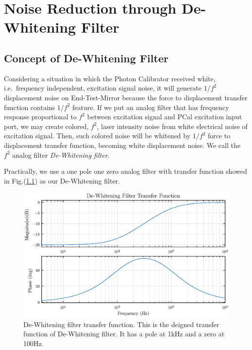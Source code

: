 

\chapter{Noise Reduction through De-Whitening Filter}

\section{Concept of De-Whitening Filter}
Considering a situation in which the Photon Calibrator received white, i.e.\ frequency independent, excitation signal noise, it will generate $1/f^2$ displacement noise on End-Test-Mirror because the force to displacement transfer function contains $1/f^2$ feature. If we put an analog filter that has frequency response proportional to $f^2$ between excitation signal and PCal excitation input port, we may create colored, $f^2$, laser intensity noise from white electrical noise of excitation signal. Then, such colored noise will be whitened by $1/f^2$ force to displacement transfer function, becoming white displacement noise. We call the $f^2$ analog filter \emph{De-Whitening filter}.


Practically, we use a one pole one zero analog filter with transfer function showed in Fig.(\ref{fig:DEWtf_design}) as our De-Whitening filter. 

\begin{figure}[hbt!]
\centering
\includegraphics[width=1\textwidth]{figure/DEWtf_design}
\caption[De-Whitening filter transfer function]{De-Whitening filter transfer function. This is the deigned transfer function of De-Whitening filter. It has a pole at 1kHz and a zero at 100Hz. }
\label{fig:DEWtf_design}
\end{figure}





